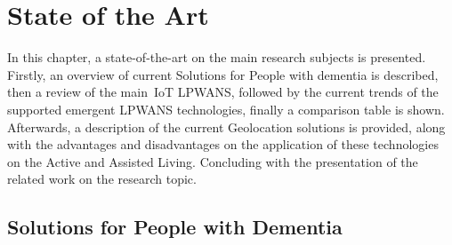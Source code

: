 \chapter{State of the Art}
\label{cha:state_of_the_art}


In this chapter, a state-of-the-art on the main research subjects is presented. Firstly, an overview of current Solutions for People with dementia is described, then a review of the main~\gls{IoT} LPWANS, followed by the current trends of the supported emergent LPWANS technologies, finally a comparison table is shown. 
Afterwards, a description of the current Geolocation solutions is provided, along with the advantages and disadvantages on the application of these technologies on the Active and Assisted Living. Concluding with the presentation of the related work on the research topic.

\section{Solutions for People with Dementia}
\label{sec:PWD_SOTA}

